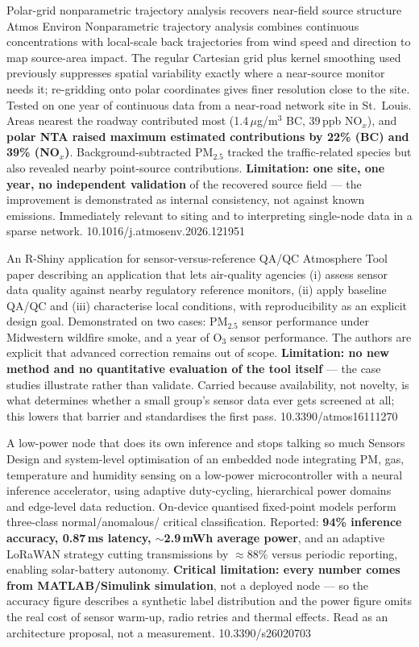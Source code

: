 \documentclass[10pt]{article}
\begin{document}
{Polar-grid nonparametric trajectory analysis recovers near-field source structure}
{Atmos Environ}
{Nonparametric trajectory analysis combines continuous concentrations with local-scale
back trajectories from wind speed and direction to map source-area impact. The regular
Cartesian grid plus kernel smoothing used previously suppresses spatial variability
exactly where a near-source monitor needs it; re-gridding onto polar coordinates gives
finer resolution close to the site. Tested on one year of continuous data from a
near-road network site in St.\ Louis. Areas nearest the roadway contributed most
(1.4\,$\mu$g/m$^3$ BC, 39\,ppb NO$_x$), and \textbf{polar NTA raised maximum estimated
contributions by 22\% (BC) and 39\% (NO$_x$)}. Background-subtracted PM$_{2.5}$ tracked
the traffic-related species but also revealed nearby point-source contributions.
\textbf{Limitation: one site, one year, no independent validation} of the recovered source
field --- the improvement is demonstrated as internal consistency, not against known
emissions. Immediately relevant to siting and to interpreting single-node data in a
sparse network.}
{10.1016/j.atmosenv.2026.121951}

{An R-Shiny application for sensor-versus-reference QA/QC}
{Atmosphere}
{Tool paper describing an application that lets air-quality agencies (i) assess sensor
data quality against nearby regulatory reference monitors, (ii) apply baseline QA/QC and
(iii) characterise local conditions, with reproducibility as an explicit design goal.
Demonstrated on two cases: PM$_{2.5}$ sensor performance under Midwestern wildfire smoke,
and a year of O$_3$ sensor performance. The authors are explicit that advanced correction
remains out of scope. \textbf{Limitation: no new method and no quantitative evaluation of
the tool itself} --- the case studies illustrate rather than validate. Carried because
availability, not novelty, is what determines whether a small group's sensor data ever
gets screened at all; this lowers that barrier and standardises the first pass.}
{10.3390/atmos16111270}

{A low-power node that does its own inference and stops talking so much}
{Sensors}
{Design and system-level optimisation of an embedded node integrating PM, gas,
temperature and humidity sensing on a low-power microcontroller with a neural inference
accelerator, using adaptive duty-cycling, hierarchical power domains and edge-level data
reduction. On-device quantised fixed-point models perform three-class normal/anomalous/
critical classification. Reported: \textbf{94\% inference accuracy, 0.87\,ms latency,
$\sim$2.9\,mWh average power}, and an adaptive LoRaWAN strategy cutting transmissions by
$\approx$88\% versus periodic reporting, enabling solar-battery autonomy.
\textbf{Critical limitation: every number comes from MATLAB/Simulink simulation}, not a
deployed node --- so the accuracy figure describes a synthetic label distribution and the
power figure omits the real cost of sensor warm-up, radio retries and thermal effects.
Read as an architecture proposal, not a measurement.}
{10.3390/s26020703}
\end{document}
